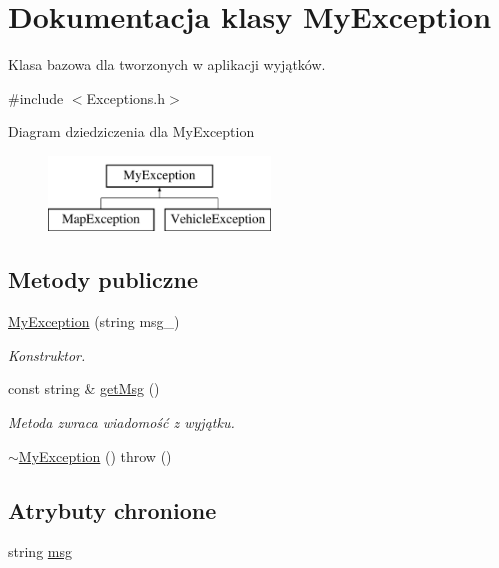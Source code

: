 \hypertarget{class_my_exception}{\section{Dokumentacja klasy My\-Exception}
\label{class_my_exception}
}


Klasa bazowa dla tworzonych w aplikacji wyjątków.  




{\ttfamily \#include $<$Exceptions.\-h$>$}

Diagram dziedziczenia dla My\-Exception\begin{figure}[H]
\begin{center}
\leavevmode
\includegraphics[height=2.000000cm]{class_my_exception}
\end{center}
\end{figure}
\subsection*{Metody publiczne}
\begin{DoxyCompactItemize}
\item 
\hyperlink{class_my_exception_abe961214430406426e1de998a7cc53e8}{My\-Exception} (string msg\-\_\-)
\begin{DoxyCompactList}\small\item\em Konstruktor. \end{DoxyCompactList}\item 
const string \& \hyperlink{class_my_exception_abba34689ff4de6027e6d9c765520ef49}{get\-Msg} ()
\begin{DoxyCompactList}\small\item\em Metoda zwraca wiadomość z wyjątku. \end{DoxyCompactList}\item 
\hyperlink{class_my_exception_aeb881435c0b8f981e04008795d4fde3b}{$\sim$\-My\-Exception} ()  throw ()
\end{DoxyCompactItemize}
\subsection*{Atrybuty chronione}
\begin{DoxyCompactItemize}
\item 
string \hyperlink{class_my_exception_ab8a915fca776573643452da65db7d3ed}{msg}
\end{DoxyCompactItemize}


